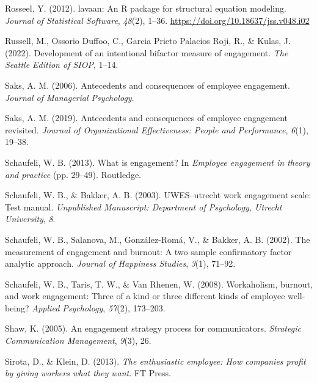 \documentclass[
  man]{apa6}
\newlength{\cslhangindent}
\newlength{\cslentryspacingunit} %
\newenvironment{CSLReferences}[2] %
 {%
  \setlength{\parindent}{0pt}
  \ifodd #1
  \let\oldpar\par
  \def\par{\hangindent=\cslhangindent\oldpar}
  \fi
  \setlength{\parskip}{#2\cslentryspacingunit}
 }%
 {}
\begin{document}
\begin{CSLReferences}{1}{0}
\leavevmode{}%
Rosseel, Y. (2012). {lavaan}: An {R} package for structural equation modeling. \emph{Journal of Statistical Software}, \emph{48}(2), 1--36. \url{https://doi.org/10.18637/jss.v048.i02}

\leavevmode{}%
Russell, M., Ossorio Duffoo, C., Garcia Prieto Palacios Roji, R., \& Kulas, J. (2022). Development of an intentional bifactor measure of engagement. \emph{The Seattle Edition of SIOP}, 1--14.

\leavevmode{}%
Saks, A. M. (2006). Antecedents and consequences of employee engagement. \emph{Journal of Managerial Psychology}.

\leavevmode{}%
Saks, A. M. (2019). Antecedents and consequences of employee engagement revisited. \emph{Journal of Organizational Effectiveness: People and Performance}, \emph{6}(1), 19--38.

\leavevmode{}%
Schaufeli, W. B. (2013). What is engagement? In \emph{Employee engagement in theory and practice} (pp. 29--49). Routledge.

\leavevmode{}%
Schaufeli, W. B., \& Bakker, A. B. (2003). {UWES}--utrecht work engagement scale: Test manual. \emph{Unpublished Manuscript: Department of Psychology, Utrecht University}, \emph{8}.

\leavevmode{}%
Schaufeli, W. B., Salanova, M., González-Romá, V., \& Bakker, A. B. (2002). The measurement of engagement and burnout: A two sample confirmatory factor analytic approach. \emph{Journal of Happiness Studies}, \emph{3}(1), 71--92.

\leavevmode{}%
Schaufeli, W. B., Taris, T. W., \& Van Rhenen, W. (2008). Workaholism, burnout, and work engagement: Three of a kind or three different kinds of employee well-being? \emph{Applied Psychology}, \emph{57}(2), 173--203.

\leavevmode{}%
Shaw, K. (2005). An engagement strategy process for communicators. \emph{Strategic Communication Management}, \emph{9}(3), 26.

\leavevmode{}%
Sirota, D., \& Klein, D. (2013). \emph{The enthusiastic employee: How companies profit by giving workers what they want}. FT Press.


\end{CSLReferences}
\end{document}
